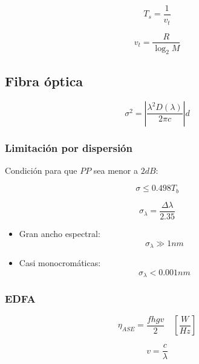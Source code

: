 \documentclass[12pt,a4paper]{article}
\begin{document}
\[ T_s = \frac{1}{v_t} \]

\[ v_t = \frac{R}{\log_2 M} \]

\subsection{Fibra óptica}
\label{sub:fibra_optica}

\[ \sigma^2 = \left| \frac{\lambda^2 D(\lambda)}{2 \pi c} \right| d \]

\subsubsection{Limitación por dispersión}
\label{ssub:limitacion_por_dispersion}

Condición para que $ PP $ sea menor a $ 2 dB $:

\[ \sigma \leq 0.498 T_b \]

\[ \sigma_{\lambda} = \frac{\Delta \lambda}{2.35} \]

\begin{itemize}
		\item Gran ancho espectral:
				\[ \sigma_{\lambda} \gg 1 nm \]
		\item Casi monocromáticas:
				\[ \sigma_{\lambda} < 0.001 nm \]
\end{itemize}

\subsubsection{EDFA}
\label{ssub:edfa}

\[ \eta_{ASE} = \frac{fhgv}{2} \quad \left[\frac{W}{Hz}\right] \]

\[ v = \frac{c}{\lambda} \]
\end{document}
